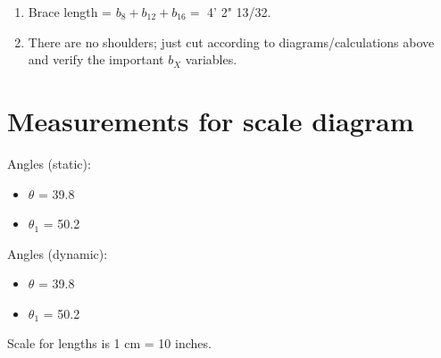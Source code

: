 \documentclass{article}\usepackage[]{graphicx}\usepackage[]{xcolor}
\begin{document}
\begin{enumerate}
  \item Brace length = $b_8 + b_{12} + b_{16} = $ 4' 2" 13/32. 
  \item There are no shoulders; just cut according to diagrams/calculations above and verify the important $b_{X}$ variables. 
\end{enumerate}


\newpage



\section{Measurements for scale diagram}
\begin{multicols}{2}
Angles (static):
\begin{itemize}
  \item $\theta$ = 39.8
  \item $\theta_1$ = 50.2
\end{itemize}
\columnbreak
Angles (dynamic):
\begin{itemize}
  \item $\theta$ = 39.8
  \item $\theta_1$ = 50.2
\end{itemize}
\end{multicols}

Scale for lengths is 1 cm = 10 inches. 
\end{document}

